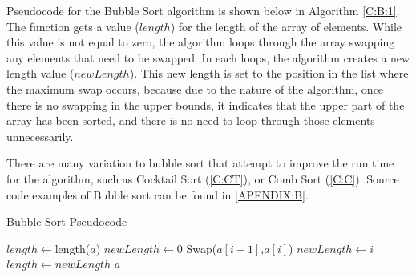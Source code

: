\documentclass{subfile}
\begin{document}
\begin{multicols}{2}
  \par
  Pseudocode for the Bubble Sort algorithm is shown below in Algorithm \ref{C:B:1}. The function gets a value ($length$) for the length of the array of elements. While this value is not equal to zero, the algorithm loops through the array swapping any elements that need to be swapped. In each loops, the algorithm creates a new length value ($newLength$). This new length is set to the position in the list where the maximum swap occurs, because due to the nature of the algorithm, once there is no swapping in the upper bounds, it indicates that the upper part of the array has been sorted, and there is no need to loop through those elements unnecessarily.
  \par
  There are many variation to bubble sort that attempt to improve the run time for the algorithm, such as Cocktail Sort (\ref{C:CT}), or Comb Sort (\ref{C:C}). Source code examples of Bubble sort can be found in \ref{APENDIX:B}. 
\end{multicols}
\newpage
\begin{algorithm}
  \caption{Bubble Sort Pseudocode}\label{C:B:1}
  \begin{algorithmic}[1]
      \State $length \gets $length($a$)
        \State $newLength \gets 0$
            \State Swap($a[i-1]$,$a[i]$)
            \State $newLength \gets i$
          \EndIf
        \EndFor
        \State $length\gets newLength$
      \EndWhile
      \State \Return $a$
    \EndFunction
  \end{algorithmic}
\end{algorithm}
\newpage
\end{document}
